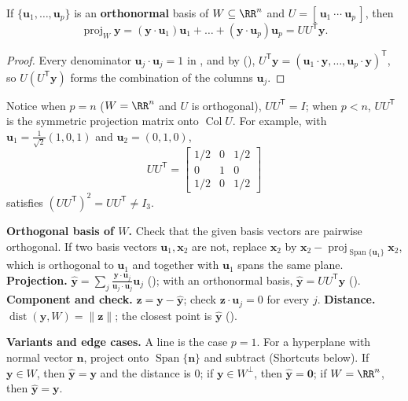 \documentclass[10pt]{scrartcl}
\newcommand{\vv}[1]{\mathbf{#1}}
\DeclareMathOperator{\spn}{Span}\DeclareMathOperator{\Nul}{Nul}\DeclareMathOperator{\Col}{Col}\DeclareMathOperator{\Row}{Row}\DeclareMathOperator{\tr}{tr}\DeclareMathOperator{\proj}{proj}\DeclareMathOperator{\dist}{dist}
\newenvironment{howto}[1]{\begin{mdframed}[style=howtostyle,frametitle={#1}]}{\end{mdframed}}
\begin{document}
\begin{theorem*}
  If $\{\vv u_1,\dots,\vv u_p\}$ is an \textbf{orthonormal} basis of $W\subseteq\RR^n$ and $U=[\,\vv u_1\ \cdots\ \vv u_p\,]$, then
  \[
    \proj_W\vv y = (\vv y\cdot\vv u_1)\vv u_1 + \dots + (\vv y\cdot\vv u_p)\vv u_p = UU^{\mathsf T}\vv y.
  \]
\end{theorem*}
\begin{proof}
  Every denominator $\vv u_j\cdot\vv u_j=1$ in , and by (), $U^{\mathsf T}\vv y=(\vv u_1\cdot\vv y,\dots,\vv u_p\cdot\vv y)^{\mathsf T}$, so $U(U^{\mathsf T}\vv y)$ forms the combination of the columns $\vv u_j$.
\end{proof}

Notice when $p=n$ ($W=\RR^n$ and $U$ is orthogonal), $UU^{\mathsf T}=I$; when $p<n$, $UU^{\mathsf T}$ is the symmetric projection matrix onto $\Col U$. For example, with $\vv u_1=\frac{1}{\sqrt{2}}(1,0,1)$ and $\vv u_2=(0,1,0)$,
\[
  UU^{\mathsf T} = \begin{bmatrix}1/2&0&1/2\\0&1&0\\1/2&0&1/2\end{bmatrix}
\]
satisfies $(UU^{\mathsf T})^2=UU^{\mathsf T}\neq I_3$.

\begin{howto}{How to project onto a line or subspace and find the distance}
  \begin{steps}
    \ii \textbf{Orthogonal basis of $W$.} Check that the given basis vectors are pairwise orthogonal. If two basis vectors $\vv u_1,\vv x_2$ are not, replace $\vv x_2$ by $\vv x_2-\proj_{\spn\{\vv u_1\}}\vv x_2$, which is orthogonal to $\vv u_1$ and together with $\vv u_1$ spans the same plane.
    \ii \textbf{Projection.} $\hat{\vv y}=\sum_j\frac{\vv y\cdot\vv u_j}{\vv u_j\cdot\vv u_j}\vv u_j$ (); with an orthonormal basis, $\hat{\vv y}=UU^{\mathsf T}\vv y$ ().
    \ii \textbf{Component and check.} $\vv z=\vv y-\hat{\vv y}$; check $\vv z\cdot\vv u_j=0$ for every $j$.
    \ii \textbf{Distance.} $\dist(\vv y,W)=\|\vv z\|$; the closest point is $\hat{\vv y}$ ().
  \end{steps}
  \textbf{Variants and edge cases.} A line is the case $p=1$. For a hyperplane with normal vector $\vv n$, project onto $\spn\{\vv n\}$ and subtract (Shortcuts below). If $\vv y\in W$, then $\hat{\vv y}=\vv y$ and the distance is $0$; if $\vv y\in W^\perp$, then $\hat{\vv y}=\vv 0$; if $W=\RR^n$, then $\hat{\vv y}=\vv y$.
\end{howto}
\end{document}
